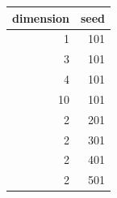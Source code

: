 \begin{tabular}{rr}
\toprule
dimension & seed \\
\midrule
1 & 101 \\
3 & 101 \\
4 & 101 \\
10 & 101 \\
2 & 201 \\
2 & 301 \\
2 & 401 \\
2 & 501 \\
\bottomrule
\end{tabular}
